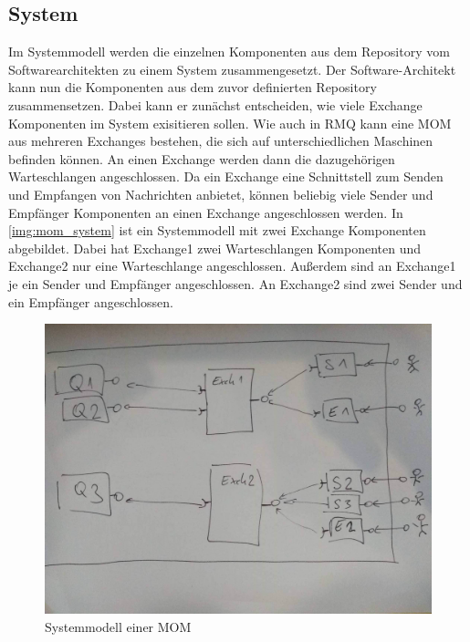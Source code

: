 \subsection{System}
Im Systemmodell werden die einzelnen Komponenten aus dem Repository vom Softwarearchitekten zu einem System zusammengesetzt. Der Software-Architekt kann nun die Komponenten aus dem zuvor definierten Repository zusammensetzen. Dabei kann er zunächst entscheiden, wie viele Exchange Komponenten im System exisitieren sollen. Wie auch in RMQ kann eine MOM aus mehreren Exchanges bestehen, die sich auf unterschiedlichen Maschinen befinden können. An einen Exchange werden dann die dazugehörigen Warteschlangen angeschlossen. Da ein Exchange eine Schnittstell zum Senden und Empfangen von Nachrichten anbietet, können beliebig viele Sender und Empfänger Komponenten an einen Exchange angeschlossen werden. In \autoref{img:mom_system} ist ein Systemmodell mit zwei Exchange Komponenten abgebildet. Dabei hat Exchange1 zwei Warteschlangen Komponenten und Exchange2 nur eine Warteschlange angeschlossen. Außerdem sind an Exchange1 je ein Sender und Empfänger angeschlossen. An Exchange2 sind zwei Sender und ein Empfänger angeschlossen. 

\begin{figure}
\center
  \includegraphics[width=1\textwidth]{images/modelling/system.png}
  \caption{Systemmodell einer MOM}
  \label{img:mom_system}
\end{figure}
